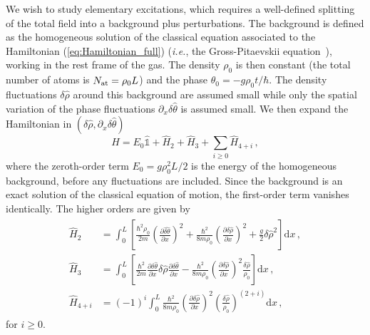 \documentclass[aps,prd,notitlepage,amsfonts,amssymb,amsmath,nofootinbib,superscriptaddress,longbibliography]{revtex4-2}
\begin{document}
We wish to study elementary excitations, which requires a well-defined splitting of the total field into a background plus perturbations. The background is defined as the homogeneous solution of
the classical equation associated to the Hamiltonian (\ref{eq:Hamiltonian_full}) ({\it i.e.}, the Gross-Pitaevskii equation~\cite{Pitaevskii2016}), working in the rest frame of the gas. 
The density $\rho_0$ is then constant (the total number of atoms is $N_{\rm at} = \rho_{0} L$) and 
the phase  $\theta_0 = - g \rho_0 t / \hbar$. The density fluctuations $ \delta \hat{\rho}$ around this background are assumed small while only the spatial variation of the phase fluctuations $\partial_x  \delta \hat{\theta} $ is assumed small. We then expand the Hamiltonian in $(\delta \hat{\rho} , \partial_x \delta \hat{\theta} )$ 
\begin{equation}
	\hat{H} = E_{0} \hat{\mathds{1}} + \hat{H}_{2} + \hat{H}_{3} + \sum_{i \geq 0} \hat{H}_{4+i} \, ,
\end{equation}
where the zeroth-order term $E_{0} = g\rho_{0}^{2}L/2$ is the energy of the homogeneous background, before any fluctuations are included.  Since the background is an exact solution of the classical equation of motion, the first-order term vanishes identically. The higher orders are given by
\begin{align}
	\begin{split}
		\label{def:expressions_pert_hamiltonian}
		\hat{H}_2 & = \int_{0}^{L} \left[ \frac{\hbar^2 \rho_0}{2m}\left(  \frac{\partial \hat{ \delta \theta} }{\partial x} \right)^2  + \frac{\hbar^2}{8 m \rho_0 } \left( \frac{\partial \delta \hat{\rho} }{\partial x} \right)^2  +  \frac{g}{2} \delta\hat{\rho}^{2} \right]  \mathrm{d}x  \, , \\
		\hat{H}_{3} & = \int_{0}^{L} \left[ \frac{\hbar^2}{2m} \frac{\partial \delta \hat{\theta} }{\partial x} \delta\hat{\rho} \frac{\partial \delta \hat{\theta} }{\partial x}   - \frac{\hbar^2}{8 m \rho_0} \left( \frac{\partial \delta \hat{\rho} }{\partial x} \right)^2  \frac{\delta \hat{\rho}}{\rho_0} \right]  \mathrm{d}x \, , \\
		\hat{H}_{4 + i} & = (-1)^i \int_{0}^{L} \frac{\hbar^2}{8 m \rho_0} \left( \frac{\partial \delta \hat{\rho}}{\partial x}\right)^2  \left( \frac{\delta \hat{\rho}}{\rho_0} \right) ^{(2+i)}  \mathrm{d}x \,, 
	\end{split}
\end{align}
for $i \geq 0$.
\end{document}
